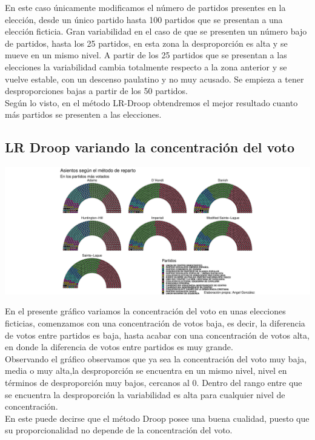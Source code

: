\documentclass[12pt,a4paper,]{book}
\numberwithin{dummy}{section}
\theoremstyle{ocrenumbox}
\theoremstyle{blacknumex}
\theoremstyle{blacknumbox}
\theoremstyle{ocrenum}
\theoremstyle{ocrenum}
\begin{document}
En este caso únicamente modificamos el número de partidos presentes en
la elección, desde un único partido hasta 100 partidos que se presentan
a una elección ficticia. Gran variabilidad en el caso de que se
presenten un número bajo de partidos, hasta los 25 partidos, en esta
zona la desproporción es alta y se mueve en un mismo nivel. A partir de
los 25 partidos que se presentan a las elecciones la variabilidad cambia
totalmente respecto a la zona anterior y se vuelve estable, con un
descenso paulatino y no muy acusado. Se empieza a tener desproporciones
bajas a partir de los 50 partidos.\\
Según lo visto, en el método LR-Droop obtendremos el mejor resultado
cuanto más partidos se presenten a las elecciones.

\hypertarget{lr-droop-variando-la-concentraciuxf3n-del-voto}{%
\subsection{LR Droop variando la concentración del
voto}\label{lr-droop-variando-la-concentraciuxf3n-del-voto}}

\begin{center}\includegraphics[width=0.95\linewidth]{figurasR/unnamed-chunk-60-1} \end{center}

En el presente gráfico variamos la concentración del voto en unas
elecciones ficticias, comenzamos con una concentración de votos baja, es
decir, la diferencia de votos entre partidos es baja, hasta acabar con
una concentración de votos alta, en donde la diferencia de votos entre
partidos es muy grande.\\
Observando el gráfico observamos que ya sea la concentración del voto
muy baja, media o muy alta,la desproporción se encuentra en un mismo
nivel, nivel en términos de desproporción muy bajos, cercanos al 0.
Dentro del rango entre que se encuentra la desproporción la variabilidad
es alta para cualquier nivel de concentración.\\
En este puede decirse que el método Droop posee una buena cualidad,
puesto que su proporcionalidad no depende de la concentración del voto.
\end{document}
